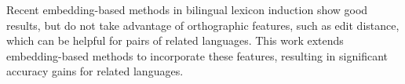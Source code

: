 Recent embedding-based methods in bilingual lexicon induction show good results, but do not take advantage of orthographic features, such as edit distance, which can be helpful for pairs of related languages. This work extends embedding-based methods to incorporate these features, resulting in significant accuracy gains for related languages.
